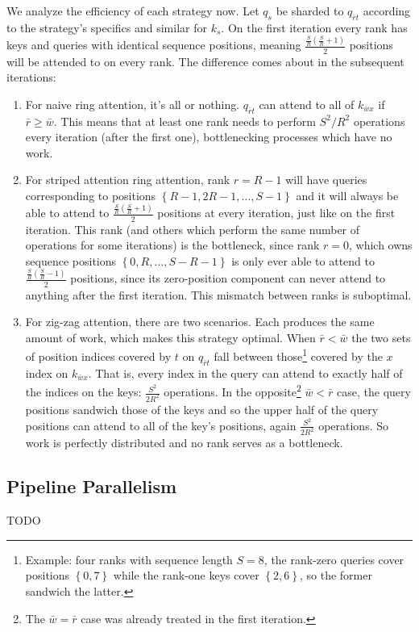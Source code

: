 We analyze the efficiency of each strategy now. Let $ q _{ s } $ be sharded to $ q _{ \bar{r}t }
$ according to the strategy's specifics and similar for $ k _{ s } $. On the first iteration every
rank has keys and queries with identical sequence positions, meaning $ \frac{ \frac{ S }{ R }\left (
\frac{ S }{ R }+1 \right ) }{2  } $ positions will be attended to on every rank. The difference
comes about in the subsequent iterations:
\begin{enumerate}
    \item For naive ring attention, it's all or nothing. $ q _{ \bar{r}t } $ can attend to all of $k
        _{ \bar{w}x } $ if $ \bar{r}\ge \bar{w} $. This means that at least one rank needs to
        perform $ S ^{ 2 } / R ^{ 2 } $ operations every iteration (after the first one),
        bottlenecking processes which have no work.
    \item For striped attention  ring attention, rank $ r= R-1 $ will have queries corresponding to
        positions $ \left \{ R-1, 2R-1, \ldots , S-1 \right \} $ and it will always be able to
        attend to $ \frac{ \frac{ S }{ R }\left ( \frac{ S }{ R }+1 \right ) }{2  }  $ positions at
        every iteration, just like on the first iteration. This rank (and others which perform the
        same number of operations for some iterations) is the bottleneck, since rank $ r=0 $, which
        owns sequence positions $ \left \{ 0, R, \ldots  , S-R-1 \right \} $ is only ever able to
        attend to $  \frac{ \frac{ S }{ R }\left ( \frac{ S }{ R }-1 \right ) }{2  }   $ positions,
        since its zero-position component can never attend to anything after the first iteration.
        This mismatch between ranks is suboptimal.
    \item For zig-zag attention, there are two scenarios. Each produces the same amount of
        work, which makes this strategy optimal. When $ \bar{r} <  \bar{w} $ the two sets of
        position indices covered by $ t $ on $ q _{ \bar{r}t } $ fall between
        those\footnote{Example: four ranks with sequence length $ S=8 $, the rank-zero queries cover
            positions $ \left \{ 0,  7 \right \} $ while the rank-one keys cover $ \left \{  2,  6
        \right \} $, so the former sandwich the latter.} covered by the $ x $ index on $ k _{
        \bar{w}x } $. That is, every index in the query can attend to exactly half of the indices on
        the keys: $ \frac{ S ^{ 2 } }{ 2R ^{ 2 } } $ operations. In the opposite\footnote{The $
        \bar{w}=\bar{r} $ case was already treated in the first iteration.} $ \bar{w} <  \bar{r} $
        case, the query positions sandwich those of the keys and so the upper half of the query
        positions can attend to all of the key's positions, again $ \frac{ S ^{ 2 } }{ 2R ^{ 2 } } $
        operations. So work is perfectly distributed and no rank serves as a bottleneck.

\end{enumerate}



\subsection{Pipeline Parallelism \label{subsec_pipe_parallelism}}

TODO
